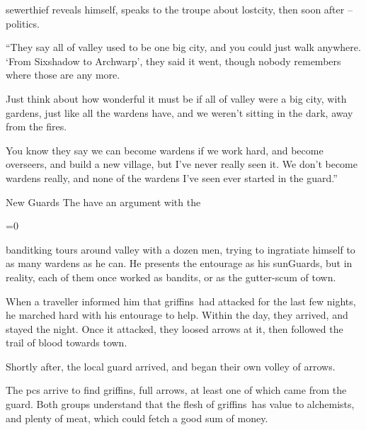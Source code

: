 \sewerthief

\Gls{sewerthief} reveals himself, speaks to the troupe about \gls{lostcity}, then soon after -- politics.

\begin{speechtext}
  ``They say all of \gls{valley} used to be one big city, and you could just walk anywhere.
  `From Sixshadow to Archwarp', they said it went, though nobody remembers where those are any more.

  Just think about how wonderful it must be if all of \gls{valley} were a big city, with gardens, just like all the \glspl{warden} have, and we weren't sitting in the dark, away from the fires.

  You know they say we can become \glspl{warden} if we work hard, and become overseers, and build a new \gls{village}, but I've never really seen it.
  We don't become \glspl{warden} really, and none of the \glspl{warden} I've seen ever started in the \gls{guard}.''
\end{speechtext}


{New Guards}%
{The  have an argument with the }%

\ifnum\value{temperature}=0
  \newcommand\localMonster{griffins}
\else
  \newcommand\localMonster{a basilisk}
\fi

\begin{exampletext}
  \Gls{banditking} tours around \gls{valley} with a dozen men, trying to ingratiate himself to as many \glspl{warden} as he can.
  He presents the entourage as his \glspl{sunGuard}, but in reality, each of them once worked as bandits, or as the gutter-scum of \gls{town}.

  When a traveller informed him that \localMonster\ had attacked  for the last few nights, he marched hard with his entourage to help.
  Within the day, they arrived, and stayed the night.
  Once it attacked, they loosed arrows at it, then followed the trail of blood towards \gls{town}.

  Shortly after, the local \gls{guard} arrived, and began their own volley of arrows.
\end{exampletext}

The \glspl{pc} arrive to find \localMonster, full arrows, at least one of which came from the \gls{guard}.
Both groups understand that the flesh of \localMonster\ has value to alchemists, and plenty of meat, which could fetch a good sum of money.

